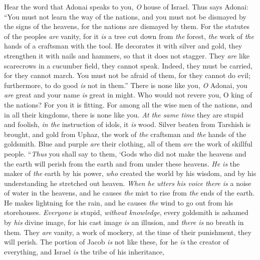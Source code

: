 \begin{biblechapter} %
\verse Hear the word that Adonai speaks to you, \textit{O} house of Israel.
\verse Thus says Adonai:
\verse “You must not learn the way of the nations, 
and you must not be dismayed by the signs of the heavens, 
for the nations are dismayed by them.
\verse For the statutes of the peoples \textit{are} vanity, 
for it \textit{is} a tree cut down from \textit{the} forest, 
\textit{the} work of \textit{the} hands of a craftsman with the tool.
\verse He decorates it with silver and gold, 
they strengthen it with nails and hammers, 
so that it does not stagger.
\verse They \textit{are} like scarecrows in a cucumber field, 
they cannot speak. 
Indeed, they must be carried, 
for they cannot march. 
You must not be afraid of them, 
for they cannot do evil; 
furthermore, to do good \textit{is} not in them.”
\verse There is none like you, \textit{O} Adonai, 
you \textit{are} great and your name \textit{is} great in might.
\verse Who would not revere you, O king of the nations? 
For you it is fitting. 
For among all the wise men of the nations, 
and in all their kingdoms, 
there is none like you.
\verse \textit{At the same time} they are stupid and foolish, 
\textit{in the} instruction of idols, it \textit{is} wood.
\verse Silver beaten from Tarshish is brought, 
and gold from Uphaz, 
the work of \textit{the} craftsman and \textit{the} hands of the goldsmith. 
Blue and purple \textit{are} their clothing, 
all of them \textit{are} the work of skillful people.
\verse “\textit{Thus} you shall say to them,
\verse ‘Gods who did not make the heavens and the earth 
will perish from the earth and from under these heavens.
\verse \textit{He is} the maker of \textit{the} earth by his power, 
\textit{who} created the world by his wisdom, 
and by his understanding he stretched out heaven.
\verse \textit{When he utters his voice} \textit{there is} a noise of water in the heavens, 
and he causes \textit{the} mist to rise from \textit{the} ends of the earth. 
He makes lightning for the rain, 
and he causes \textit{the} wind to go out from his storehouses.
\verse \textit{Everyone} is stupid, \textit{without knowledge}, 
every goldsmith is ashamed by \textit{his} divine image, 
for his cast image \textit{is} an illusion, 
and \textit{there is} no breath in them.
\verse They \textit{are} vanity, a work of mockery, 
at the time of their punishment, they will perish.
\verse The portion of Jacob \textit{is} not like these, 
for he \textit{is} the creator of everything, 
and Israel \textit{is} the tribe of his inheritance, 

\end{biblechapter}
